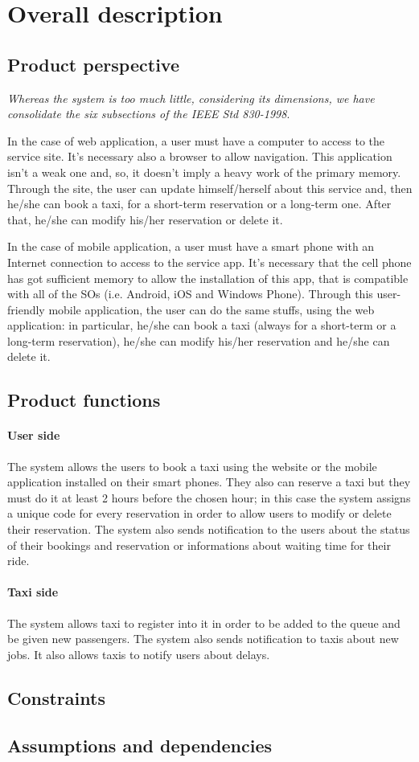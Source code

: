 \section{Overall description}
	\subsection{Product perspective}
		\emph{Whereas the system is too much little, considering its dimensions, we have consolidate the six subsections of the IEEE Std 830-1998}.
		\vspace{10pt}
		
		In the case of web application, a user must have a computer to access to the service site. It's necessary also a browser to allow navigation. This application isn't a weak one and, so, it doesn't imply a heavy work of the primary memory. 
		Through the site, the user can update himself/herself about this service and, then he/she can book a taxi, for a short-term reservation or a long-term one. After that, he/she can modify his/her reservation or delete it.
		
		In the case of mobile application, a user must have a smart phone with an Internet connection to access to the service app. It's necessary that the cell phone has got sufficient memory to allow the installation of this app, that is compatible with all of the SOs (i.e. Android, iOS and Windows Phone).
		Through this user-friendly mobile application, the user can do the same stuffs, using the web application: in particular, he/she can book a taxi (always for a short-term or a long-term reservation), he/she can modify his/her reservation and he/she can delete it. 
	\subsection{Product functions}
		\paragraph{User side}The system allows the users to book a taxi using the website or the mobile application installed on their smart phones. They also can reserve a taxi but they must do it at least 2 hours before the chosen hour; in this case the system assigns a unique code for every reservation in order to allow users to modify or delete their reservation. The system also sends notification to the users about the status of their bookings and reservation or informations about waiting time for their ride.
		\paragraph{Taxi side}The system allows taxi to register into it in order to be added to the queue and be given new passengers. The system also sends notification to taxis about new jobs. It also allows taxis to notify users about delays.
	\subsection{Constraints}
	\subsection{Assumptions and dependencies}